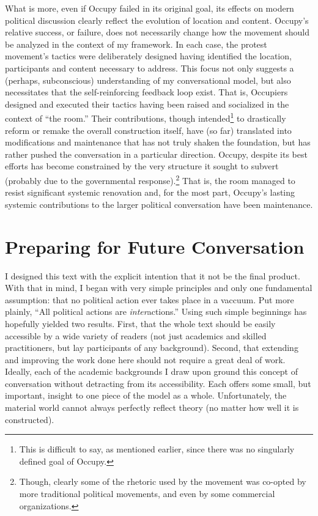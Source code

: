 \documentclass[openany,twoside]{memoir}
\begin{document}
\begin{Spacing}{2}
What is more, even if Occupy failed in its original goal, its effects on modern political discussion clearly reflect the evolution of location and content.
Occupy's relative success, or failure, does not necessarily change how the movement should be analyzed in the context of my framework.
In each case, the protest movement's tactics were deliberately designed having identified the location, participants and content necessary to address.
This focus not only suggests a (perhaps, subconscious) understanding of my conversational model, but also necessitates that the self-reinforcing feedback loop exist.
That is, Occupiers designed and executed their tactics having been raised and socialized in the context of ``the room.''
Their contributions, though intended\footnote{
This is difficult to say, as mentioned earlier, since there was no singularly defined goal of Occupy.}
to drastically reform or remake the overall construction itself, have (so far) translated into modifications and maintenance that has not truly shaken the foundation, but has rather pushed the conversation in a particular direction.
Occupy, despite its best efforts has become constrained by the very structure it sought to subvert (probably due to the governmental response).\footnote{
Though, clearly some of the rhetoric used by the movement was co-opted by more traditional political movements, and even by some commercial organizations.}
That is, the room managed to resist significant systemic renovation and, for the most part, Occupy's lasting systemic contributions to the larger political conversation have been maintenance.

\chapter{Preparing for Future Conversation}
I designed this text with the explicit intention that it not be the final product.
With that in mind, I began with very simple principles and only one fundamental assumption: that no political action ever takes place in a vaccuum.
Put more plainly, ``All political actions are \emph{inter}actions.''
Using such simple beginnings has hopefully yielded two results.
First, that the whole text should be easily accessible by a wide variety of readers (not just academics and skilled practitioners, but lay participants of any background).
Second, that extending and improving the work done here should not require a great deal of work.
Ideally, each of the academic backgrounds I draw upon ground this concept of conversation without detracting from its accessibility.
Each offers some small, but important, insight to one piece of the model as a whole.
Unfortunately, the material world cannot always perfectly reflect theory (no matter how well it is constructed).


\end{Spacing}
\end{document}
